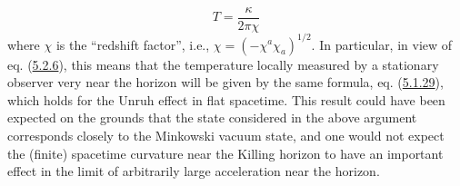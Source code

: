 \documentclass[11pt,a4paper]{article}
\begin{document}
\hypertarget{source-138}{}
\begin{equation*}
T = \frac{\kappa}{2\pi\chi} \tag{5.3.3}\label{eq:5.3.3}
\end{equation*}
where \(\chi\) is the ``redshift factor'', i.e., \(\chi = (-\chi^a \chi_a)^{1/2}\). In particular, in view of eq. (\hyperref[eq:5.2.6]{5.2.6}), this means that the temperature locally measured by a stationary observer very near the horizon will be given by the same formula, eq. (\hyperref[eq:5.1.29]{5.1.29}), which holds for the Unruh effect in flat spacetime. This result could have been expected on the grounds that the state considered in the above argument corresponds closely to the Minkowski vacuum state, and one would not expect the (finite) spacetime curvature near the Killing horizon to have an important effect in the limit of arbitrarily large acceleration near the horizon.
\end{document}
